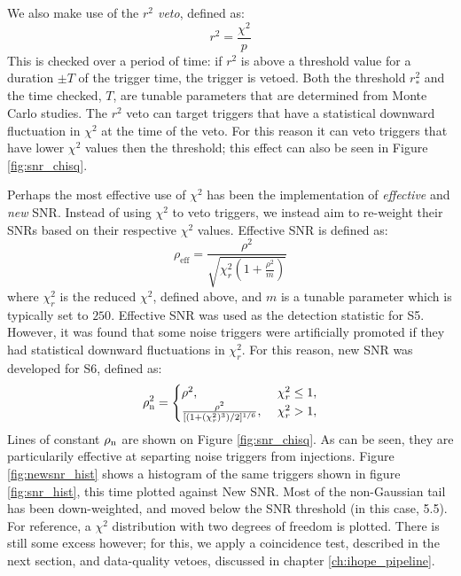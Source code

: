 We also make use of the \emph{$r^2$ veto}, defined as:
\begin{equation}
r^2 = \frac{\chi^2}{p}
\end{equation}
This is checked over a period of time: if $r^2$ is above a threshold value for a duration $\pm T$ of the trigger time, the trigger is vetoed. Both the threshold $r_{*}^2$ and the time checked, $T$, are tunable parameters that are determined from Monte Carlo studies. The $r^2$ veto can target triggers that have a statistical downward fluctuation in $\chi^2$ at the time of the veto. For this reason it can veto triggers that have lower $\chi^2$ values then the threshold; this effect can also be seen in Figure \ref{fig:snr_chisq}. 

Perhaps the most effective use of $\chi^2$ has been the implementation of \emph{effective} and \emph{new} \ac{SNR}. Instead of using $\chi^2$ to veto triggers, we instead aim to re-weight their \acp{SNR} based on their respective $\chi^2$ values. Effective \ac{SNR} is defined as:
\begin{equation}
\label{eqn:effective_snr}
\rho_{\mathrm{eff}} = \frac{\rho^2}{\sqrt{\chi_r^2\left(1 + \frac{\rho^2}{m}\right)}}
\end{equation}
where $\chi_r^2$ is the reduced $\chi^2$, defined above, and $m$ is a tunable parameter which is typically set to $250$. Effective \ac{SNR} was used as the detection statistic for \ac{S5}. However, it was found that some noise triggers were artificially promoted if they had statistical downward fluctuations in $\chi_r^2$. For this reason, new \ac{SNR} was developed for \ac{S6}, defined as:
\begin{equation}
\label{eqn:new_snr}
\rhonew^2 = \begin{cases}
 \rho^2, & \chi^2_{r} \leq 1, \\ 
 \frac{\rho^2}{[(1+(\chi_r^2)^3)/2]^{1/6}}, \ & \chi^2_{r} > 1,  \end{cases}  
\end{equation}
Lines of constant $\rho_{\mathrm{n}}$ are shown on Figure \ref{fig:snr_chisq}. As can be seen, they are particularily effective at separting noise triggers from injections. Figure \ref{fig:newsnr_hist} shows a histogram of the same triggers shown in figure \ref{fig:snr_hist}, this time plotted against New \ac{SNR}. Most of the non-Gaussian tail has been down-weighted, and moved below the \ac{SNR} threshold (in this case, 5.5). For reference, a $\chi^2$ distribution with two degrees of freedom is plotted. There is still some excess however; for this, we apply a coincidence test, described in the next section, and data-quality vetoes, discussed in chapter \ref{ch:ihope_pipeline}.

